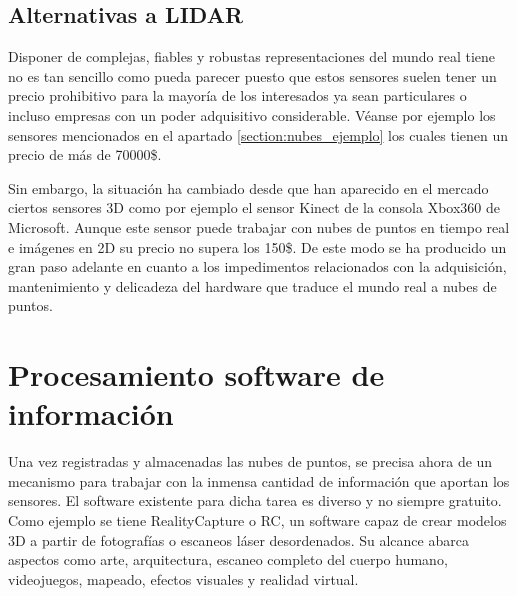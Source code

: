 


\subsection{Alternativas a LIDAR}

Disponer de complejas, fiables y robustas representaciones del mundo real tiene no es tan sencillo como pueda parecer puesto que estos sensores suelen tener un precio prohibitivo para la mayoría de los interesados ya sean particulares o incluso empresas con un poder adquisitivo considerable. Véanse por ejemplo los sensores mencionados en el apartado \ref{section:nubes_ejemplo} los cuales tienen un precio de más de 70000\$.

Sin embargo, la situación ha cambiado desde que han aparecido en el mercado ciertos sensores 3D como por ejemplo el sensor Kinect de la consola Xbox360 de Microsoft\cite{kinect}. Aunque este sensor puede trabajar con nubes de puntos en tiempo real e imágenes en 2D su precio no supera los 150\$. De este modo se ha producido un gran paso adelante en cuanto a los impedimentos relacionados con la adquisición, mantenimiento y delicadeza del hardware que traduce el mundo real a nubes de puntos.



\section{Procesamiento software de información}\label{librerias}

Una vez registradas y almacenadas las nubes de puntos, se precisa ahora de un mecanismo para trabajar con la inmensa cantidad de información que aportan los sensores. El software existente para dicha tarea es diverso y no siempre gratuito. Como ejemplo se tiene RealityCapture\cite{realitycapture} o RC, un software capaz de crear modelos 3D a partir de fotografías o escaneos láser desordenados. Su alcance abarca aspectos como arte, arquitectura, escaneo completo del cuerpo humano, videojuegos, mapeado, efectos visuales y realidad virtual.

